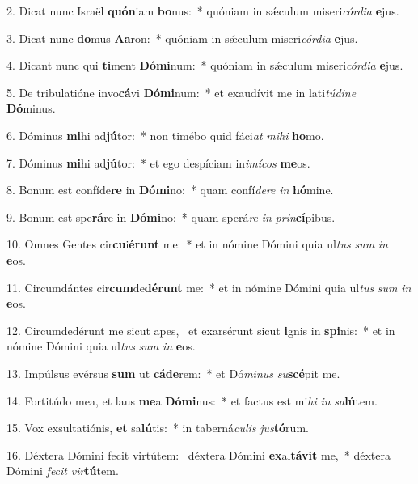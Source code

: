 2. Dicat nunc Israël \textbf{quón}iam \textbf{bo}nus:~*  quóniam in sǽculum miseri\textit{cór}\textit{di}\textit{a} \textbf{e}jus.\

3. Dicat nunc \textbf{do}mus \textbf{A}\textbf{a}ron:~*  quóniam in sǽculum miseri\textit{cór}\textit{di}\textit{a} \textbf{e}jus.\

4. Dicant nunc qui \textbf{ti}ment \textbf{Dó}\textbf{mi}num:~*  quóniam in sǽculum miseri\textit{cór}\textit{di}\textit{a} \textbf{e}jus.\

5. De tribulatióne invo\textbf{cá}vi \textbf{Dó}\textbf{mi}num:~*  et exaudívit me in lati\textit{tú}\textit{di}\textit{ne} \textbf{Dó}minus.\

6. Dóminus \textbf{mi}hi ad\textbf{jú}tor:~*  non timébo quid fáci\textit{at} \textit{mi}\textit{hi} \textbf{ho}mo.\

7. Dóminus \textbf{mi}hi ad\textbf{jú}tor:~*  et ego despíciam in\textit{i}\textit{mí}\textit{cos} \textbf{me}os.\

8. Bonum est confíde\textbf{re} in \textbf{Dó}\textbf{mi}no:~*  quam confí\textit{de}\textit{re} \textit{in} \textbf{hó}mine.\

9. Bonum est spe\textbf{rá}re in \textbf{Dó}\textbf{mi}no:~*  quam sperá\textit{re} \textit{in} \textit{prin}\textbf{cí}pibus.\

10. Omnes Gentes cir\textbf{cu}i\textbf{é}\textbf{runt} me:~*  et in nómine Dómini quia ul\textit{tus} \textit{sum} \textit{in} \textbf{e}os.\

11. Circumdántes cir\textbf{cum}de\textbf{dé}\textbf{runt} me:~*  et in nómine Dómini quia ul\textit{tus} \textit{sum} \textit{in} \textbf{e}os.\

12. Circumdedérunt me sicut apes, \dag\  et exarsérunt sicut \textbf{i}gnis in \textbf{spi}nis:~*  et in nómine Dómini quia ul\textit{tus} \textit{sum} \textit{in} \textbf{e}os.\

13. Impúlsus evérsus \textbf{sum} ut \textbf{cá}\textbf{de}rem:~*  et Dó\textit{mi}\textit{nus} \textit{su}\textbf{scé}pit me.\

14. Fortitúdo mea, et laus \textbf{me}a \textbf{Dó}\textbf{mi}nus:~*  et factus est mi\textit{hi} \textit{in} \textit{sa}\textbf{lú}tem.\

15. Vox exsultatiónis, \textbf{et} sa\textbf{lú}tis:~*  in taberná\textit{cu}\textit{lis} \textit{jus}\textbf{tó}rum.\

16. Déxtera Dómini fecit virtútem: \dag\  déxtera Dómini \textbf{ex}al\textbf{tá}\textbf{vit} me,~*  déxtera Dómini \textit{fe}\textit{cit} \textit{vir}\textbf{tú}tem.\


